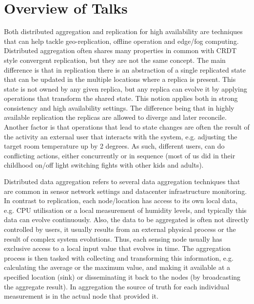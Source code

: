 \documentclass[a4paper,UKenglish]{dagrep-v2018}
\begin{document}
\tableofcontents


\section{Overview of Talks}


\license

Both distributed aggregation and replication for high availability are techniques that can help tackle geo-replication, offline operation and edge/fog computing. Distributed aggregation often shares many properties in common with CRDT style convergent replication, but they are not the same concept. 
The main difference is that in replication there is an abstraction of a single replicated state that can be updated in the multiple locations where a replica is present. This state is not owned by any given replica, but any replica can evolve it by applying operations that transform the shared state. This notion applies both in strong consistency and high availability settings. The difference being that in highly available replication the replicas are allowed to diverge and later reconcile. Another factor is that operations that lead to state changes are often the result of the activity an external user that interacts with the system, e.g. adjusting the target room temperature up by 2 degrees. As such, different users, can do conflicting actions, either concurrently or in sequence (most of us did in their childhood on/off light switching fights with other kids and adults).

Distributed data aggregation refers to several data aggregation techniques that are common in sensor network settings and datacenter infrastructure monitoring. In contrast to replication, each node/location has access to its own local data, e.g. CPU utilisation or a local measurement of humidity levels, and typically this data can evolve continuously. Also, the data to be aggregated is often not directly controlled by users, it usually results from an external physical process or the result of complex system evolutions. Thus, each sensing node usually has exclusive access to a local input value that evolves in time. The aggregation process is then tasked with collecting and transforming this information, e.g. calculating the average or the maximum value, and making it available at a specified location (sink) or disseminating it back to the nodes (by broadcasting the aggregate result). In aggregation the source of truth for each individual measurement is in the actual node that provided it.
\end{document}
